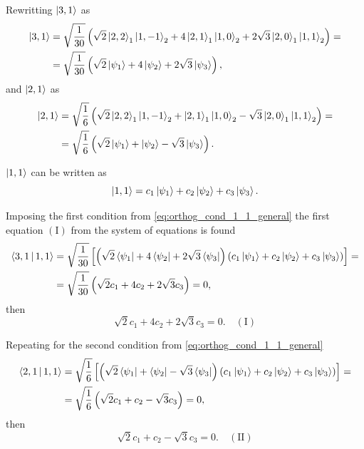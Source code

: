 Rewritting $\Ket{3,1}$ as 
\begin{align}
    \notag
    \Ket{3,1 } &=
    \sqrt{\frac{1}{30}} \left( \sqrt{2} \Ket{2,2}_1 \Ket{1,-1}_2 + 4 \Ket{2,1}_1 \Ket{1,0}_2 + 2\sqrt{3} \Ket{2,0}_1 \Ket{1,1}_2 \right)
    = \\
               &=
    \sqrt{\frac{1}{30}} \left( \sqrt{2} \Ket{\psi_1} + 4 \Ket{\psi_2} + 2\sqrt{3} \Ket{\psi_3} \right),
\end{align}
and $\Ket{2,1}$ as 
\begin{align}
    \notag
    \Ket{2,1} &=
    \sqrt{\frac{1}{6}} \left( \sqrt{2} \Ket{2,2}_1 \Ket{1,-1}_2 + \Ket{2,1}_1 \Ket{1,0}_2 - \sqrt{3} \Ket{2,0}_1 \Ket{1,1}_2 \right)
    = \\
              &=
    \sqrt{\frac{1}{6}} \left( \sqrt{2} \Ket{\psi_1} + \Ket{\psi_2} - \sqrt{3} \Ket{\psi_3} \right).
\end{align}

$\Ket{1,1}$ can be written as 
\begin{equation}\label{eq:lin_comb_1_1}
    \Ket{1,1} =
    c_1 \Ket{\psi_1} + c_2 \Ket{\psi_2} + c_3 \Ket{\psi_3}.
\end{equation}

Imposing the first condition from \cref{eq:orthog_cond_1_1_general} the first equation $\left( \mathrm{I} \right)$ from the system of equations is found
\begin{align}
    \notag
    \Braket{3,1 | 1,1} &=
    \sqrt{\frac{1}{30}} \left[
        \left( \sqrt{2} \Bra{\psi_1} + 4 \Bra{\psi_2} + 2\sqrt{3} \Bra{\psi_3} \right)
        \left( c_1 \Ket{\psi_1} + c_2 \Ket{\psi_2} + c_3 \Ket{\psi_3} \right)
    \right]
    = \\
    &= 
    \sqrt{\frac{1}{30}} \left(
        \sqrt{2} c_1 + 4 c_2 + 2\sqrt{3} c_3
    \right)
    = 0,
\end{align}
then 
\begin{equation}
    \sqrt{2} c_1 + 4 c_2 + 2\sqrt{3} c_3 = 0.
    \quad \left( \mathrm{I} \right)
\end{equation}

Repeating for the second condition from \cref{eq:orthog_cond_1_1_general}
\begin{align}
    \notag
    \Braket{2,1 | 1,1} &=
    \sqrt{\frac{1}{6}} \left[
        \left( \sqrt{2} \Bra{\psi_1} + \Bra{\psi_2} - \sqrt{3} \Bra{\psi_3} \right)
        \left( c_1 \Ket{\psi_1} + c_2 \Ket{\psi_2} + c_3 \Ket{\psi_3} \right)
    \right]
    \notag
    = \\
                       &= 
    \sqrt{\frac{1}{6}} \left(
        \sqrt{2} c_1 + c_2 - \sqrt{3} c_3
    \right)
    = 0,
\end{align}
then 
\begin{equation}
    \sqrt{2} c_1 + c_2 - \sqrt{3} c_3 = 0.
    \quad \left( \mathrm{II} \right)
\end{equation}

